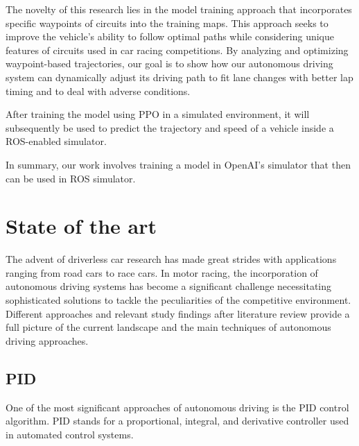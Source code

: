 \documentclass[conference]{IEEEtran}
\begin{document}
The novelty of this research lies in the model training approach that incorporates specific waypoints of circuits into the training maps.
%
This approach seeks to improve the vehicle’s ability to follow optimal paths while considering unique features of circuits used in car racing competitions.
%
By analyzing and optimizing waypoint-based trajectories, our goal is to show how our autonomous driving system can dynamically adjust its driving path to fit lane changes with better lap timing and to deal with adverse conditions.

After training the model using PPO in a simulated environment, it will subsequently be used to predict the trajectory and speed of a vehicle inside a ROS-enabled simulator.

In summary, our work involves training a model in OpenAI’s simulator that then can be used in ROS simulator.

\section{State of the art}




The advent of driverless car research has made great strides with applications ranging from road cars to race cars.
%
In motor racing, the incorporation of autonomous driving systems has become a significant challenge necessitating sophisticated solutions to tackle the peculiarities of the competitive environment.
%
Different approaches and relevant study findings after literature review provide a full picture of the current landscape and the main techniques of autonomous driving approaches.

%
%
%
\subsection{PID}

One of the most significant approaches of autonomous driving is the PID control algorithm.
%
PID stands for a proportional, integral, and derivative controller used in automated control systems.
\end{document}
